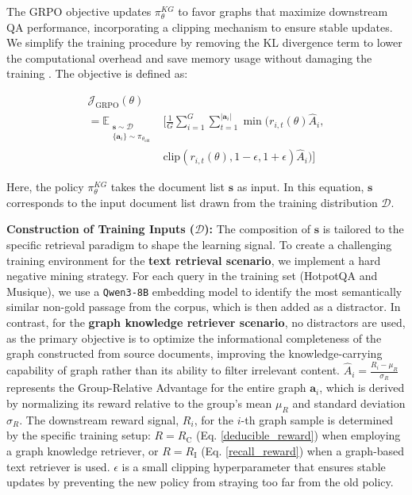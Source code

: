 \documentclass[11pt]{article}
\begin{document}
The GRPO objective updates $\pi_\theta^{KG}$ to favor graphs that maximize downstream QA performance, incorporating a clipping mechanism to ensure stable updates. We simplify the training procedure by removing the KL divergence term to lower the computational overhead and save memory usage without damaging the training \citep{liu_understanding_2025,hu_open-reasoner-zero_2025}. The objective is defined as:

\begin{equation}
\begin{split}
\mathcal{J}_{\text{GRPO}}(\theta) & \\
= \mathbb{E}_{\substack{\mathbf{s} \sim \mathcal{D} \\ \{\mathbf{a}_i\} \sim \pi_{\theta_{\text{old}}}}} & \bigg[ \frac{1}{G} \sum_{i=1}^{G} \sum_{t=1}^{|\mathbf{a}_i|} \min \Big( r_{i,t}(\theta) \hat{A}_i, \\
& \text{clip}(r_{i,t}(\theta), 1-\epsilon, 1+\epsilon) \hat{A}_i \Big) \bigg]
\end{split}
\end{equation}

\noindent Here, the policy $\pi_{\theta}^{KG}$ takes the document list $\mathbf{s}$ as input. In this equation, $\mathbf{s}$ corresponds to the input document list drawn from the training distribution $\mathcal{D}$. 

\textbf{Construction of Training Inputs ($\mathcal{D}$):} The composition of $\mathbf{s}$ is tailored to the specific retrieval paradigm to shape the learning signal. To create a challenging training environment for the \textbf{text retrieval scenario}, we implement a hard negative mining strategy. For each query in the training set (HotpotQA and Musique), we use a \texttt{Qwen3-8B} \citep{zhang_qwen3_2025} embedding model to identify the most semantically similar non-gold passage from the corpus, which is then added as a distractor. In contrast, for the \textbf{graph knowledge retriever scenario}, no distractors are used, as the primary objective is to optimize the informational completeness of the graph constructed from source documents, improving the knowledge-carrying capability of graph rather than its ability to filter irrelevant content. $\hat{A}_i = \frac{R_i-\mu_R}{\sigma_R}$ represents the Group-Relative Advantage for the entire graph $\mathbf{a}_i$, which is derived by normalizing its reward relative to the group's mean $\mu_R$ and standard deviation $\sigma_R$. The downstream reward signal, $R_i$, for the $i$-th graph sample is determined by the specific training setup: $R=R_{\text{C}}$ (Eq. \ref{deducible_reward}) when employing a graph knowledge retriever, or $R=R_{\text{I}}$ (Eq. \ref{recall_reward}) when a graph-based text retriever is used. $\epsilon$ is a small clipping hyperparameter that ensures stable updates by preventing the new policy from straying too far from the old policy.
\end{document}
